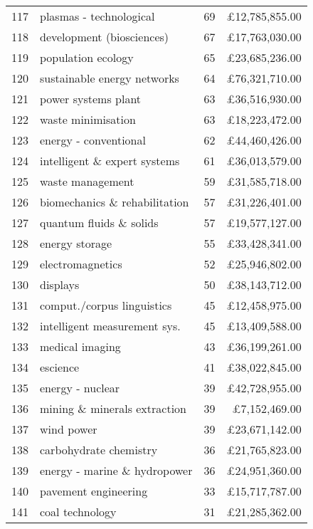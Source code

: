 \begin{spacing}{0.9}
\begin{longtable}[c]{r|>{\raggedleft\arraybackslash}m{6.5cm}|>{\raggedleft\arraybackslash}m{1.9cm}|r}
{117} & {plasmas - technological} & {69} & {\pounds12,785,855.00}\\
{118} & {development (biosciences)} & {67} & {\pounds17,763,030.00}\\
{119} & {population ecology} & {65} & {\pounds23,685,236.00}\\
{120} & {sustainable energy networks} & {64} & {\pounds76,321,710.00}\\
{121} & {power systems plant} & {63} & {\pounds36,516,930.00}\\
{122} & {waste minimisation} & {63} & {\pounds18,223,472.00}\\
{123} & {energy - conventional} & {62} & {\pounds44,460,426.00}\\
{124} & {intelligent \& expert systems} & {61} & {\pounds36,013,579.00}\\
{125} & {waste management} & {59} & {\pounds31,585,718.00}\\
{126} & {biomechanics \& rehabilitation} & {57} & {\pounds31,226,401.00}\\
{127} & {quantum fluids \& solids} & {57} & {\pounds19,577,127.00}\\
{128} & {energy storage} & {55} & {\pounds33,428,341.00}\\
{129} & {electromagnetics} & {52} & {\pounds25,946,802.00}\\
{130} & {displays} & {50} & {\pounds38,143,712.00}\\
{131} & {comput./corpus linguistics} & {45} & {\pounds12,458,975.00}\\
{132} & {intelligent measurement sys.} & {45} & {\pounds13,409,588.00}\\
{133} & {medical imaging} & {43} & {\pounds36,199,261.00}\\
{134} & {escience} & {41} & {\pounds38,022,845.00}\\
{135} & {energy - nuclear} & {39} & {\pounds42,728,955.00}\\
{136} & {mining \& minerals extraction} & {39} & {\pounds7,152,469.00}\\
{137} & {wind power} & {39} & {\pounds23,671,142.00}\\
{138} & {carbohydrate chemistry} & {36} & {\pounds21,765,823.00}\\
{139} & {energy - marine \& hydropower} & {36} & {\pounds24,951,360.00}\\
{140} & {pavement engineering} & {33} & {\pounds15,717,787.00}\\
{141} & {coal technology} & {31} & {\pounds21,285,362.00}\\

\end{longtable}
\end{spacing}

